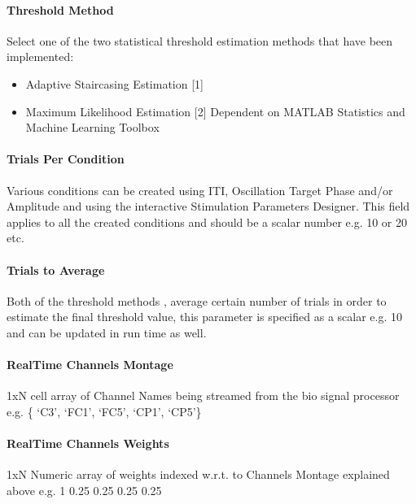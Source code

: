 \documentclass[letterpaper,10pt,english]{sphinxmanual}
\begin{document}
\paragraph{Threshold Method}
\label{\detokenize{15_SensoryThresholdHunting:threshold-method}}
\sphinxAtStartPar
Select one of the two statistical threshold estimation methods that have been implemented:
\begin{itemize}
\item {} 
\sphinxAtStartPar
Adaptive Staircasing Estimation {[}1{]}

\item {} 
\sphinxAtStartPar
Maximum Likelihood Estimation {[}2{]} \textendash{} Dependent on MATLAB Statistics and Machine Learning Toolbox

\end{itemize}


\paragraph{Trials Per Condition}
\label{\detokenize{15_SensoryThresholdHunting:trials-per-condition}}
\sphinxAtStartPar
Various conditions can be created using ITI, Oscillation Target Phase and/or Amplitude and using the interactive Stimulation Parameters Designer. This field applies to all the created conditions and should be a scalar number e.g. 10 or 20 etc.


\paragraph{Trials to Average}
\label{\detokenize{15_SensoryThresholdHunting:trials-to-average}}
\sphinxAtStartPar
Both of the threshold methods , average certain number of trials in order to estimate the final threshold value, this parameter is specified as a scalar e.g. 10 and can be updated in run time as well.


\paragraph{Real\sphinxhyphen{}Time Channels Montage}
\label{\detokenize{15_SensoryThresholdHunting:real-time-channels-montage}}
\sphinxAtStartPar
1xN cell array of Channel Names being streamed from the bio signal processor e.g. \{ ‘C3’, ‘FC1’, ‘FC5’, ‘CP1’, ‘CP5’\}


\paragraph{Real\sphinxhyphen{}Time Channels Weights}
\label{\detokenize{15_SensoryThresholdHunting:real-time-channels-weights}}
\sphinxAtStartPar
1xN Numeric array of weights indexed w.r.t. to Channels Montage explained above e.g. 1 \sphinxhyphen{}0.25 \sphinxhyphen{}0.25 \sphinxhyphen{}0.25 \sphinxhyphen{}0.25
\end{document}
